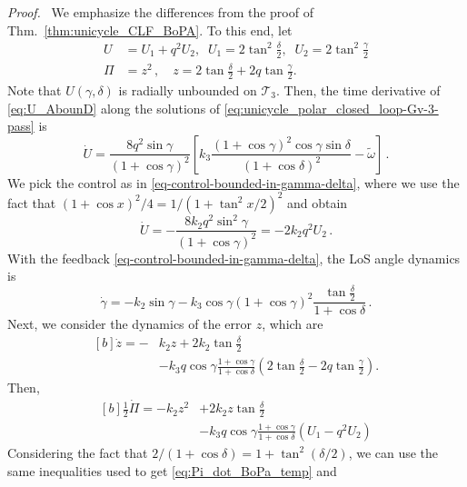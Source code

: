 \documentclass[journal,twoside,web]{ieeecolor}
\theoremstyle{definition}
\renewenvironment{proof}[1][Proof]{\par\pushQED{\qed}\normalfont\textit{#1.}~}{\popQED\par}
\begin{document}
\begin{proof}
We emphasize the differences from the proof of Thm.~\ref{thm:unicycle_CLF_BoPA}. To this end, let
\begin{align}
    U &=  U_1 + q^2 U_2, \;\; 
    U_1 = 2\tan^2 \frac{\delta}{2}, \;\; U_2 = 2\tan^2 \frac{\gamma}{2} \label{eq:U_AbounD}\\
    \Pi &= z^2\,, \quad z = 2\tan\frac{\delta}{2} +  2q \tan\frac{\gamma}{2}.
\end{align}
Note that $U(\gamma,\delta)$ is radially unbounded on $\mathcal{T}_3$. 
Then, the time derivative of \eqref{eq:U_AbounD} along the solutions of \eqref{eq:unicycle_polar_closed_loop-Gv-3-pass} is
\begin{equation}
\dot U  =  \frac{8 q^2 \sin \gamma}{(1+\cos\gamma)^2} \left[   k_3   \frac{(1+\cos\gamma)^2 \cos\gamma \sin \delta}{ (1+\cos \delta)^2 } - \tilde{\omega}
\right]\,. 
\end{equation}
We pick the control as in \eqref{eq-control-bounded-in-gamma-delta}, where we use the fact that $(1+\cos x )^2/4 = 1/(1+\tan^2 x/2)^2$ and obtain
\begin{equation}
\dot U  = -\frac{8 k_2  q^2 \sin^2\gamma}{(1+\cos\gamma)^2}   = - 2 k_2 q^2 U_2\,. \label{eq:U_dot_abound}
\end{equation}
With the feedback \eqref{eq-control-bounded-in-gamma-delta}, the LoS angle dynamics is 
\begin{equation}
\dot\gamma = - k_2 \sin\gamma -  k_3  \cos\gamma (1+\cos\gamma)^2  \frac{\tan \frac{\delta}{2}}{1 + \cos \delta} \,.
\end{equation}
Next, we consider the dynamics of the error  $z$, which are
\begin{equation}
\begin{aligned}[b]
\dot z = -&k_2 z + 2 k_2 \tan \frac{\delta}{2}\\
&- k_3 q \cos \gamma \frac{1 + \cos \gamma}{1 + \cos \delta} \left( 2\tan \frac{\delta}{2 } -  2q \tan \frac{\gamma}{2} \right).
\end{aligned}
\end{equation}
Then,
\begin{equation}
\begin{aligned}[b]
\frac{1}{2} \dot \Pi = - k_2z^2 &+  2k_2 z \tan \frac{\delta}{2} \\
&- 
k_3 q \cos\gamma \frac{1+\cos\gamma}{1 + \cos \delta} \left(U_1 - q^2U_2 \right) 
\end{aligned}
\end{equation}
Considering the fact that $2/(1 + \cos \delta) = 1 + \tan^2(\delta/2)$, we can use the same inequalities used to get \eqref{eq:Pi_dot_BoPa_temp} and

\end{proof}
\end{document}
